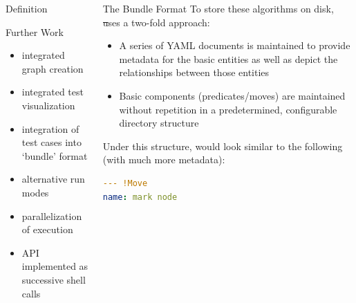 \documentclass{beamer}
\begin{document}
\begin{frame}[fragile,t]
\begin{columns}[t]
\begin{column}{.45\textwidth}
\begin{block}{Definition}
\begin{center}
        \end{center}
      \end{block}
      \begin{block}{Further Work}
        \begin{multicols}{2}
          \begin{itemize}
          \item integrated graph creation
          \item integrated test visualization
          \item integration of test cases into `bundle' format
          \item alternative run modes
          \item parallelization of execution
          \item API implemented as successive shell calls
          \end{itemize}
        \end{multicols}%
        \vspace*{-.04in}%
      \end{block}
    \end{column}
    \begin{column}{.45\textwidth}
      \begin{block}{The Bundle Format}
        To store these algorithms on disk, \st uses a two-fold approach:
        \begin{itemize}
        \item A series of YAML documents is maintained to provide
          metadata for the basic entities as well as depict the
          relationships between those entities
        \item Basic components (predicates\slash moves) are maintained
          without repetition in a predetermined, configurable
          directory structure
        \end{itemize}
        Under this structure, \IndSet would look similar to the following
          (with much more metadata):
          \vspace{.13in}
\begin{lstlisting}[language=yaml,basicstyle=\ttfamily\YAMLkeystyle]
--- !Move
name: mark node

\end{lstlisting}
\end{block}
\end{column}
\end{columns}
\end{frame}
\end{document}
